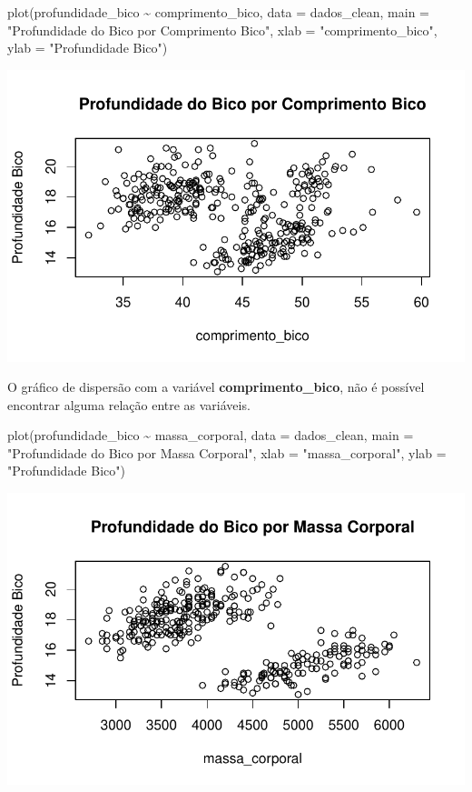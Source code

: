 \documentclass[
  letterpaper,
  DIV=11,
  numbers=noendperiod]{scrartcl}
\newenvironment{Shaded}{\begin{snugshade}}{\end{snugshade}}
\newcommand{\AttributeTok}[1]{\textcolor[rgb]{0.40,0.45,0.13}{#1}}
\newcommand{\FunctionTok}[1]{\textcolor[rgb]{0.28,0.35,0.67}{#1}}
\newcommand{\NormalTok}[1]{\textcolor[rgb]{0.00,0.23,0.31}{#1}}
\newcommand{\SpecialCharTok}[1]{\textcolor[rgb]{0.37,0.37,0.37}{#1}}
\newcommand{\StringTok}[1]{\textcolor[rgb]{0.13,0.47,0.30}{#1}}
\begin{document}
\begin{Shaded}
\begin{Highlighting}[]
\FunctionTok{plot}\NormalTok{(profundidade\_bico }\SpecialCharTok{\textasciitilde{}}\NormalTok{ comprimento\_bico, }\AttributeTok{data =}\NormalTok{ dados\_clean, }
        \AttributeTok{main =} \StringTok{"Profundidade do Bico por Comprimento Bico"}\NormalTok{,}
        \AttributeTok{xlab =} \StringTok{"comprimento\_bico"}\NormalTok{, }\AttributeTok{ylab =} \StringTok{"Profundidade Bico"}\NormalTok{)}
\end{Highlighting}
\end{Shaded}

\includegraphics{r_files/figure-pdf/unnamed-chunk-3-1.pdf}

O gráfico de dispersão com a variável \textbf{comprimento\_bico}, não é
possível encontrar alguma relação entre as variáveis.

\begin{Shaded}
\begin{Highlighting}[]
\FunctionTok{plot}\NormalTok{(profundidade\_bico }\SpecialCharTok{\textasciitilde{}}\NormalTok{ massa\_corporal, }\AttributeTok{data =}\NormalTok{ dados\_clean, }
        \AttributeTok{main =} \StringTok{"Profundidade do Bico por Massa Corporal"}\NormalTok{,}
        \AttributeTok{xlab =} \StringTok{"massa\_corporal"}\NormalTok{, }\AttributeTok{ylab =} \StringTok{"Profundidade Bico"}\NormalTok{)}
\end{Highlighting}
\end{Shaded}

\includegraphics{r_files/figure-pdf/unnamed-chunk-4-1.pdf}
\end{document}
